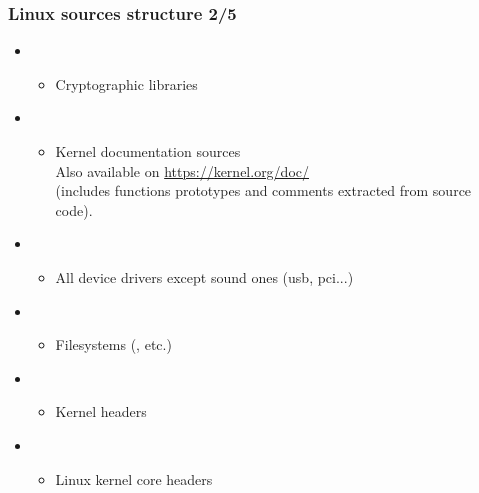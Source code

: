 \begin{frame}
  \frametitle{Linux sources structure 2/5}
  \begin{itemize}
  \item {}
    \begin{itemize}
    \item Cryptographic libraries
    \end{itemize}
  \item {}
    \begin{itemize}
    \item Kernel documentation sources\\
     Also available on \url{https://kernel.org/doc/}\\
     (includes functions prototypes and comments
     extracted from source code).
    \end{itemize}
  \item {}
    \begin{itemize}
    \item All device drivers except sound ones (usb, pci...)
    \end{itemize}
  \item {}
    \begin{itemize}
    \item Filesystems (, etc.)
    \end{itemize}
  \item {}
    \begin{itemize}
    \item Kernel headers
    \end{itemize}
  \item {}
    \begin{itemize}
    \item Linux kernel core headers
    \end{itemize}
  \end{itemize}
\end{frame}

